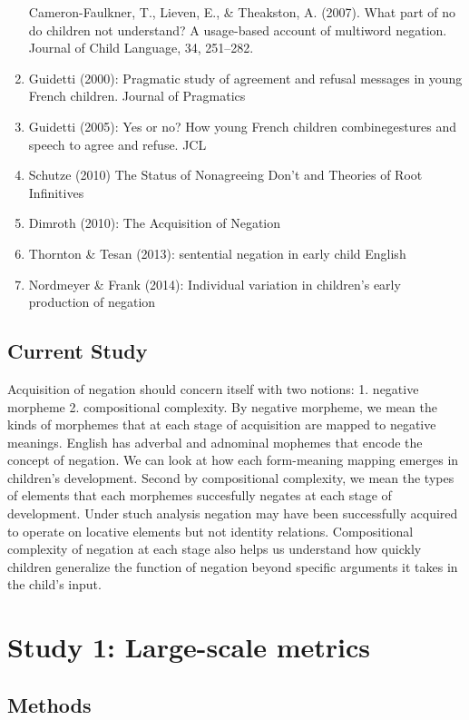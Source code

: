 \documentclass[man,floatsintext,draftall]{apa6}
\begin{document}
\begin{enumerate}
  Cameron-Faulkner, T., Lieven, E., \& Theakston, A. (2007). What part of no do children not understand? A usage-based account of multiword negation. Journal of Child Language, 34, 251--282.
\item
  Guidetti (2000): Pragmatic study of agreement and refusal messages in young French children. Journal of Pragmatics
\item
  Guidetti (2005): Yes or no? How young French children combinegestures and speech to agree and refuse. JCL
\item
  Schutze (2010) The Status of Nonagreeing Don't and Theories of Root Infinitives
\item
  Dimroth (2010): The Acquisition of Negation
\item
  Thornton \& Tesan (2013): sentential negation in early child English
\item
  Nordmeyer \& Frank (2014): Individual variation in children's early production of negation
\end{enumerate}

\hypertarget{current-study}{%
\subsection{Current Study}\label{current-study}}

Acquisition of negation should concern itself with two notions: 1. negative morpheme 2. compositional complexity. By negative morpheme, we mean the kinds of morphemes that at each stage of acquisition are mapped to negative meanings. English has adverbal and adnominal mophemes that encode the concept of negation. We can look at how each form-meaning mapping emerges in children's development. Second by compositional complexity, we mean the types of elements that each morphemes succesfully negates at each stage of development. Under stuch analysis negation may have been successfully acquired to operate on locative elements but not identity relations. Compositional complexity of negation at each stage also helps us understand how quickly children generalize the function of negation beyond specific arguments it takes in the child's input.

\hypertarget{study-1-large-scale-metrics}{%
\section{Study 1: Large-scale metrics}\label{study-1-large-scale-metrics}}

\hypertarget{methods}{%
\subsection{Methods}\label{methods}}
\end{document}
